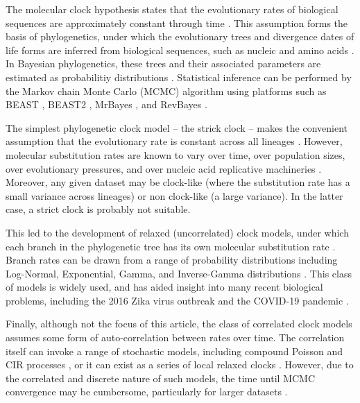 \documentclass[10pt,letterpaper]{article}
\begin{document}
The molecular clock hypothesis states that the evolutionary rates of biological sequences are approximately constant through time \cite{zuckerkandl1962molecular}.
This assumption forms the basis of phylogenetics, under which the evolutionary trees and divergence dates of life forms are inferred from biological sequences, such as nucleic and amino acids \cite{douzery2003local, drummond2006relaxed}.
In Bayesian phylogenetics, these trees and their associated parameters are estimated as probabilitiy distributions \cite{kuhner1995estimating, larget1999markov, mau1999bayesian}. 
Statistical inference can be performed by the Markov chain Monte Carlo (MCMC) algorithm \cite{metropolis53, hastings70} using platforms such as BEAST \cite{drummond2012bayesian}, BEAST2 \cite{bouckaert2019beast}, MrBayes \cite{ronquist2012mrbayes}, and RevBayes \cite{hohna2016revbayes}.



The simplest phylogenetic clock model -- the strick clock -- makes the convenient assumption that the evolutionary rate is constant across all lineages \cite{zuckerkandl1965evolutionary, kuhner1995estimating, larget1999markov}.  %
However, molecular substitution rates are known to vary over time, over population sizes, over evolutionary pressures, and over nucleic acid replicative machineries \cite{gillespie1994causes, woolfit2009effective, loh2010optimization}.
Moreover, any given dataset may be clock-like (where the substitution rate has a small variance across lineages) or non clock-like (a large variance). 
In the latter case, a strict clock is probably not suitable. 



This led to the development of relaxed (uncorrelated) clock models, under which each branch in the phylogenetic tree has its own molecular substitution rate  \cite{drummond2006relaxed}.
Branch rates can be drawn from a range of probability distributions including Log-Normal, Exponential, Gamma, and Inverse-Gamma distributions \cite{drummond2006relaxed, lepage2007general, li2012model}.
This class of models is widely used, and has aided insight into many recent biological problems, including the 2016 Zika virus outbreak \cite{faria2017establishment} and the COVID-19 pandemic \cite{giovanetti2020first}.

Finally, although not the focus of this article, the class of correlated clock models assumes some form of auto-correlation between rates over time. 
The correlation itself can invoke a range of stochastic models, including compound Poisson \cite{huelsenbeck2000compound} and CIR processes \cite{lepage2007general}, or it can exist as a series of local relaxed clocks \cite{drummond2010bayesian}. 
However, due to the correlated and discrete nature of such models, the time until MCMC convergence may be cumbersome, particularly for larger datasets \cite{drummond2010bayesian}.  
\end{document}
